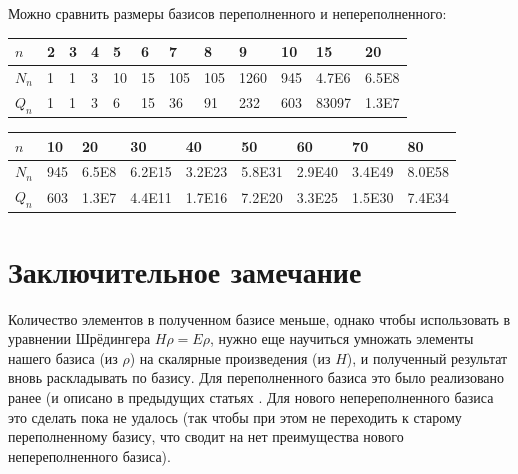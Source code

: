\documentclass[]{article}
\renewcommand{\[}{\begin{equation}}
\renewcommand{\]}{\end{equation}}
\begin{document}
Можно сравнить размеры базисов переполненного и непереполненного:

\begin{tabular}{ |l|l l l l l l l l l l l| }
	\hline
	$n$   & 2 & 3 & 4 & 5  & 6  & 7   & 8   & 9    & 10  & 15    & 20    
	\\ \hline
	$N_n$ & 1 & 1 & 3 & 10 & 15 & 105 & 105 & 1260 & 945 & 4.7E6 & 6.5E8 
	\\ %
	$Q_n$ & 1 & 1 & 3 & 6  & 15 & 36  & 91  & 232  & 603 & 83097 & 1.3E7 
	\\ \hline
\end{tabular}

\begin{tabular}{ |l|l l l l l l l l| }
	\hline
	$n$   & 10  & 20    & 30     & 40     & 50     & 60     & 70     & 80
	\\ \hline
	$N_n$ & 945 & 6.5E8 & 6.2E15 & 3.2E23 & 5.8E31 & 2.9E40 & 3.4E49 & 8.0E58
	\\ %
	$Q_n$ & 603 & 1.3E7 & 4.4E11 & 1.7E16 & 7.2E20 & 3.3E25 & 1.5E30 & 7.4E34
	\\ \hline
\end{tabular}

\section{Заключительное замечание}
Количество элементов в полученном базисе меньше,
однако чтобы использовать в уравнении Шрёдингера $H \rho = E \rho$, нужно еще научиться умножать элементы нашего базиса (из $\rho$) на скалярные произведения (из $H$), и полученный результат вновь раскладывать по базису.
Для переполненного базиса это было реализовано ранее (и описано в предыдущих статьях \cite{variational}.
Для нового непереполненного базиса это сделать пока не удалось (так чтобы при этом не переходить к старому переполненному базису, что сводит на нет преимущества нового непереполненного базиса).
\end{document}
